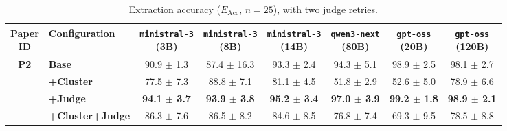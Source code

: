 \begin{table}[htbp]
    \centering
    \small
    \setlength{\tabcolsep}{4pt}
    \caption{Extraction accuracy ($E_{\text{Acc}}$, $n=25$), with two judge retries.}
    \begin{tabular}{c|l|cccccc}
        \toprule
        \makecell{\textbf{Paper} \\ \textbf{ID}} & \textbf{Configuration}& \makecell{\texttt{ministral-3} \\ (3B)} & \makecell{\texttt{ministral-3} \\ (8B)} & \makecell{\texttt{ministral-3} \\ (14B)} & \makecell{\texttt{qwen3-next} \\ (80B)} & \makecell{\texttt{gpt-oss} \\ (20B)} & \makecell{\texttt{gpt-oss} \\ (120B)} \\
        \hline
        
        \multirow{4}{*}{\textbf{P2}} 
          & \textbf{Base}& 90.9 $\pm$ 1.3 & 87.4 $\pm$ 16.3 & 93.3 $\pm$ 2.4 & 94.3 $\pm$ 5.1 & 98.9 $\pm$ 2.5 & 98.1 $\pm$ 2.7 \\
          & \textbf{+Cluster}& 77.5 $\pm$ 7.3 & 88.8 $\pm$ 7.1 & 81.1 $\pm$ 4.5 & 51.8 $\pm$ 2.9 & 52.6 $\pm$ 5.0 & 78.9 $\pm$ 6.6 \\
          & \textbf{+Judge}& \textbf{94.1 $\pm$ 3.7} & \textbf{93.9 $\pm$ 3.8} & \textbf{95.2 $\pm$ 3.4} & \textbf{97.0 $\pm$ 3.9} & \textbf{99.2 $\pm$ 1.8} & \textbf{98.9 $\pm$ 2.1} \\
          & \textbf{+Cluster+Judge}& 86.3 $\pm$ 7.6 & 86.5 $\pm$ 8.2 & 84.6 $\pm$ 8.5 & 76.8 $\pm$ 7.4 & 69.3 $\pm$ 9.5 & 78.5 $\pm$ 8.8 \\
        \hline
        
        \bottomrule
    \end{tabular}
    \label{tab:results_p2}
\end{table}